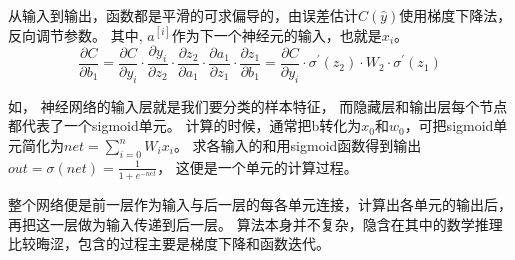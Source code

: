 \noindent
从输入到输出，函数都是平滑的可求偏导的，由误差估计$C(\hat{y})$使用梯度下降法，反向调节参数。
其中, $a^{[i]}$作为下一个神经元的输入，也就是$x_i$。
$$
\frac{\partial{C}}{\partial{b_1}} 
= 
	\frac{\partial{C}}{\partial{y_i}} \cdot
	\frac{\partial{y_i}}{\partial{z_2}} \cdot
	\frac{\partial{z_2}}{\partial{a_1}} \cdot
	\frac{\partial{a_1}}{\partial{z_1}} \cdot
	\frac{\partial{z_1}}{\partial{b_1}}
= 
	\frac{\partial{C}}{\partial{y_i}} \cdot
		\sigma^{'}(z_2) \cdot W_2 \cdot \sigma^{'}(z_1)
$$


如，
神经网络的输入层就是我们要分类的样本特征，
而隐藏层和输出层每个节点都代表了一个sigmoid单元。
计算的时候，通常把b转化为$x_0$和$w_0$，可把sigmoid单元简化为$net=\sum_{i=0}^nW_ix_i$。
求各输入的和用sigmoid函数得到输出$out=\sigma(net)=\frac{1}{1+e^{-net}}$，
这便是一个单元的计算过程。

整个网络便是前一层作为输入与后一层的每各单元连接，计算出各单元的输出后，再把这一层做为输入传递到后一层。
算法本身并不复杂，隐含在其中的数学推理比较晦涩，包含的过程主要是梯度下降和函数迭代。

